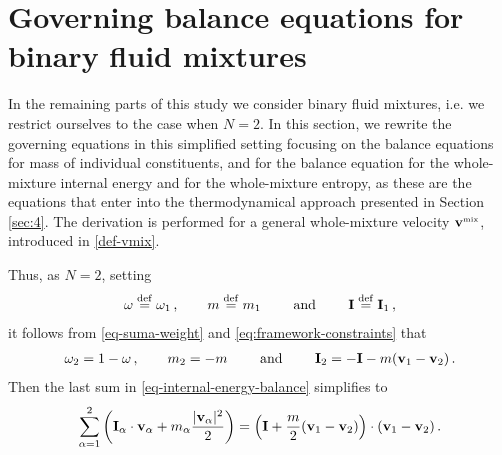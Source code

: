 \documentclass[a4paper]{article}
\begin{document}
\section{Governing balance equations for binary fluid mixtures}
\label{sec-binary-mixture}

In the remaining parts of this study we consider binary fluid mixtures, i.e. we restrict ourselves to the case when $N{=}2$. In this section, we rewrite the governing equations in this simplified setting focusing on the balance equations for mass of individual constituents, and for the balance equation for the whole-mixture internal energy and for the whole-mixture entropy, as these are the equations that enter into the thermodynamical approach presented in Section \ref{sec:4}. The derivation is performed for a general whole-mixture velocity ${\bf v}^{\mbox{\tiny{mix}}}$, introduced in \eqref{def-vmix}.

Thus, as $N{=}2$, setting
\begin{align}
\label{def-relabel0}
\omega\stackrel{\mathrm{def}}{=} \omega_1\,, \qquad 
m\stackrel{\mathrm{def}}{=} m_1\qquad\textrm{ and } \qquad {\mathbf{I}}\stackrel{\mathrm{def}}{=}{\mathbf{I}}_1\,,
\end{align}
it follows from \eqref{eq-suma-weight}  and \eqref{eq:framework-constraints} that 
\begin{align}
\label{def-relabel1}
\omega_2 = 1-\omega\,, \qquad
m_2 =  - m  \qquad \textrm{ and } \qquad {\mathbf{I}}_2 = - {\mathbf{I}} - m ({\bf v}_1 - {\bf v}_2)\,.
\end{align}
Then the last sum in \eqref{eq-internal-energy-balance} simplifies to 
\begin{align}
\label{def-relabel2}
\sum_{\alpha=1}^2\left( {\mathbf{I}}_\alpha\cdot{\bf v}_\alpha +  m_\alpha\frac{|{\bf v}_\alpha|^2}{2}\right) = \left({\mathbf{I}} + \frac{m}{2}({\bf v}_1 - {\bf v}_2)\right)\cdot ({\bf v}_1 - {\bf v}_2)\,.
\end{align}
\end{document}
